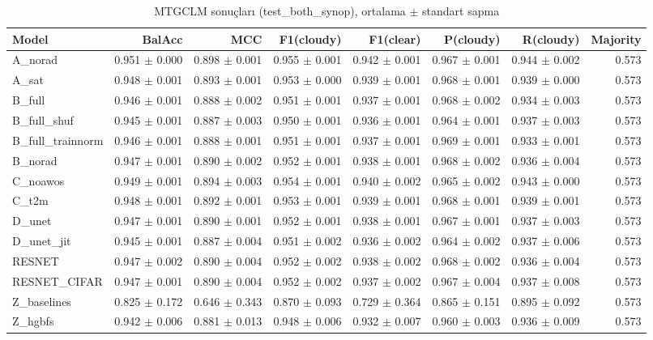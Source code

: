 \begin{table}[ht]
\centering
\caption{MTGCLM sonuçları (test_both_synop), ortalama $\pm$ standart sapma}
\label{tab:results_test_both_synop}
\begin{tabular}{lrrrrrrr}
\hline
Model & BalAcc & MCC & F1(cloudy) & F1(clear) & P(cloudy) & R(cloudy) & Majority \\
\hline
A\_norad & 0.951 $\pm$ 0.000 & 0.898 $\pm$ 0.001 & 0.955 $\pm$ 0.001 & 0.942 $\pm$ 0.001 & 0.967 $\pm$ 0.001 & 0.944 $\pm$ 0.002 & 0.573 \\
A\_sat & 0.948 $\pm$ 0.001 & 0.893 $\pm$ 0.001 & 0.953 $\pm$ 0.000 & 0.939 $\pm$ 0.001 & 0.968 $\pm$ 0.001 & 0.939 $\pm$ 0.000 & 0.573 \\
B\_full & 0.946 $\pm$ 0.001 & 0.888 $\pm$ 0.002 & 0.951 $\pm$ 0.001 & 0.937 $\pm$ 0.001 & 0.968 $\pm$ 0.002 & 0.934 $\pm$ 0.003 & 0.573 \\
B\_full\_shuf & 0.945 $\pm$ 0.001 & 0.887 $\pm$ 0.003 & 0.950 $\pm$ 0.001 & 0.936 $\pm$ 0.001 & 0.964 $\pm$ 0.001 & 0.937 $\pm$ 0.003 & 0.573 \\
B\_full\_trainnorm & 0.946 $\pm$ 0.001 & 0.888 $\pm$ 0.001 & 0.951 $\pm$ 0.001 & 0.937 $\pm$ 0.001 & 0.969 $\pm$ 0.001 & 0.933 $\pm$ 0.001 & 0.573 \\
B\_norad & 0.947 $\pm$ 0.001 & 0.890 $\pm$ 0.002 & 0.952 $\pm$ 0.001 & 0.938 $\pm$ 0.001 & 0.968 $\pm$ 0.002 & 0.936 $\pm$ 0.004 & 0.573 \\
C\_noawos & 0.949 $\pm$ 0.001 & 0.894 $\pm$ 0.003 & 0.954 $\pm$ 0.001 & 0.940 $\pm$ 0.002 & 0.965 $\pm$ 0.002 & 0.943 $\pm$ 0.000 & 0.573 \\
C\_t2m & 0.948 $\pm$ 0.001 & 0.892 $\pm$ 0.001 & 0.953 $\pm$ 0.001 & 0.939 $\pm$ 0.001 & 0.968 $\pm$ 0.001 & 0.939 $\pm$ 0.001 & 0.573 \\
D\_unet & 0.947 $\pm$ 0.001 & 0.890 $\pm$ 0.001 & 0.952 $\pm$ 0.001 & 0.938 $\pm$ 0.001 & 0.967 $\pm$ 0.001 & 0.937 $\pm$ 0.003 & 0.573 \\
D\_unet\_jit & 0.945 $\pm$ 0.001 & 0.887 $\pm$ 0.004 & 0.951 $\pm$ 0.002 & 0.936 $\pm$ 0.002 & 0.964 $\pm$ 0.002 & 0.937 $\pm$ 0.006 & 0.573 \\
RESNET & 0.947 $\pm$ 0.002 & 0.890 $\pm$ 0.004 & 0.952 $\pm$ 0.002 & 0.938 $\pm$ 0.002 & 0.968 $\pm$ 0.002 & 0.936 $\pm$ 0.004 & 0.573 \\
RESNET\_CIFAR & 0.947 $\pm$ 0.001 & 0.890 $\pm$ 0.004 & 0.952 $\pm$ 0.002 & 0.937 $\pm$ 0.002 & 0.967 $\pm$ 0.004 & 0.937 $\pm$ 0.008 & 0.573 \\
Z\_baselines & 0.825 $\pm$ 0.172 & 0.646 $\pm$ 0.343 & 0.870 $\pm$ 0.093 & 0.729 $\pm$ 0.364 & 0.865 $\pm$ 0.151 & 0.895 $\pm$ 0.092 & 0.573 \\
Z\_hgbfs & 0.942 $\pm$ 0.006 & 0.881 $\pm$ 0.013 & 0.948 $\pm$ 0.006 & 0.932 $\pm$ 0.007 & 0.960 $\pm$ 0.003 & 0.936 $\pm$ 0.009 & 0.573 \\
\hline
\end{tabular}
\end{table}
